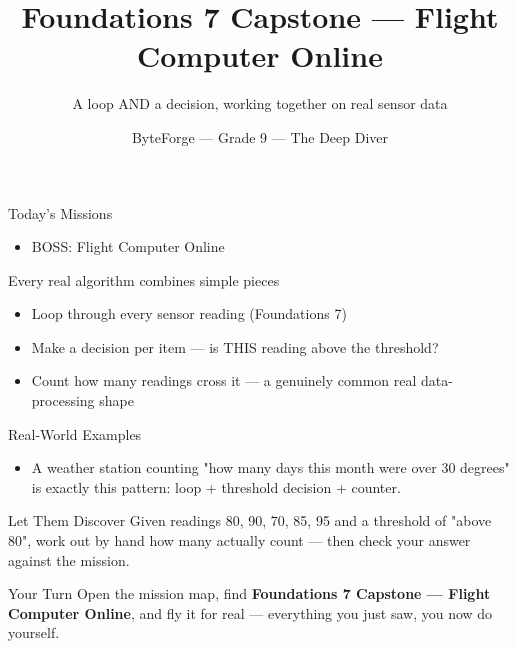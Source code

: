 \documentclass[aspectratio=169]{beamer}
\title{Foundations 7 Capstone — Flight Computer Online}
\subtitle{A loop AND a decision, working together on real sensor data}
\author{ByteForge --- Grade 9 --- The Deep Diver}
\date{}
\begin{document}
\begin{frame}
    \titlepage
\end{frame}

\begin{frame}{Today's Missions}
    \Large
    \begin{itemize}
        \item BOSS: Flight Computer Online
    \end{itemize}
\end{frame}

\begin{frame}{Every real algorithm combines simple pieces}
    \large
    \begin{itemize}
        \item Loop through every sensor reading (Foundations 7)
        \item Make a decision per item --- is THIS reading above the threshold?
        \item Count how many readings cross it --- a genuinely common real data-processing shape
    \end{itemize}
\end{frame}

\begin{frame}{Real-World Examples}
    \large
    \begin{itemize}
        \item A weather station counting "how many days this month were over 30 degrees" is exactly this pattern: loop + threshold decision + counter.
    \end{itemize}
\end{frame}


\begin{frame}{Let Them Discover}
    \large
    Given readings 80, 90, 70, 85, 95 and a threshold of "above 80", work out by hand how many actually count --- then check your answer against the mission.
\end{frame}

\begin{frame}{Your Turn}
    \Large
    Open the mission map, find \textbf{Foundations 7 Capstone — Flight Computer Online}, and fly it for real ---
    everything you just saw, you now do yourself.
\end{frame}
\end{document}
